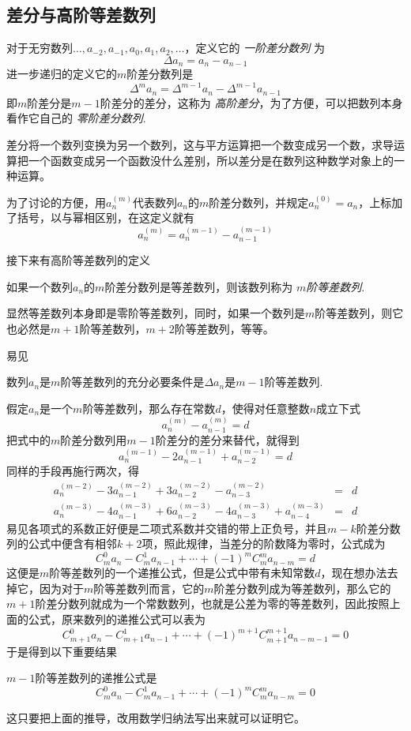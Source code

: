 \subsection{差分与高阶等差数列}
\label{sec:difference-and-high-level-common-difference-sequence}

\begin{definition}
  对于无穷数列$\ldots,a_{-2},a_{-1},a_0,a_1,a_2,\ldots$，定义它的 \emph{一阶差分数列} 为
  \[ \Delta a_n = a_n-a_{n-1} \]
  进一步递归的定义它的$m$阶差分数列是
  \[ \Delta^ma_n = \Delta^{m-1}a_n - \Delta^{m-1}a_{n-1} \]
  即$m$阶差分是$m-1$阶差分的差分，这称为 \emph{高阶差分}，为了方便，可以把数列本身看作它自己的 \emph{零阶差分数列}.
\end{definition}

差分将一个数列变换为另一个数列，这与平方运算把一个数变成另一个数，求导运算把一个函数变成另一个函数没什么差别，所以差分是在数列这种数学对象上的一种运算。

为了讨论的方便，用$a_n^{(m)}$代表数列$a_n$的$m$阶差分数列，并规定$a_n^{(0)}=a_n$，上标加了括号，以与幂相区别，在这定义就有
\[ a_n^{(m)} = a_n^{(m-1)} - a_{n-1}^{(m-1)} \]

接下来有高阶等差数列的定义
\begin{definition}
  如果一个数列$a_n$的$m$阶差分数列是等差数列，则该数列称为 \emph{$m$阶等差数列}.
\end{definition}

显然等差数列本身即是零阶等差数列，同时，如果一个数列是$m$阶等差数列，则它也必然是$m+1$阶等差数列，$m+2$阶等差数列，等等。

易见
\begin{theorem}
  数列$a_n$是$m$阶等差数列的充分必要条件是$\Delta a_n$是$m-1$阶等差数列.
\end{theorem}

假定$a_n$是一个$m$阶等差数列，那么存在常数$d$，使得对任意整数$n$成立下式
\[ a_n^{(m)} - a_{n-1}^{(m)} = d \]
把式中的$m$阶差分数列用$m-1$阶差分的差分来替代，就得到
\[ a_n^{(m-1)}-2a_{n-1}^{(m-1)}+a_{n-2}^{(m-1)} = d \]
同样的手段再施行两次，得
\begin{eqnarray*}
 a_n^{(m-2)}-3a_{n-1}^{(m-2)}+3a_{n-2}^{(m-2)}-a_{n-3}^{(m-2)} & = & d  \\
 a_n^{(m-3)}-4a_{n-1}^{(m-3)}+6a_{n-2}^{(m-3)}-4a_{n-3}^{(m-3)}+a_{n-4}^{(m-3)} & = & d 
\end{eqnarray*}
易见各项式的系数正好便是二项式系数并交错的带上正负号，并且$m-k$阶差分数列的公式中便含有相邻$k+2$项，照此规律，当差分的阶数降为零时，公式成为
\[ C_m^0a_n-C_m^1a_{n-1}+\cdots+(-1)^mC_m^ma_{n-m} = d \]
这便是$m$阶等差数列的一个递推公式，但是公式中带有未知常数$d$，现在想办法去掉它，因为对于$m$阶等差数列而言，它的$m$阶差分数列成为等差数列，那么它的$m+1$阶差分数列就成为一个常数数列，也就是公差为零的等差数列，因此按照上面的公式，原来数列的递推公式可以表为
\[ C_{m+1}^0a_n-C_{m+1}^1a_{n-1}+\cdots+(-1)^{m+1}C_{m+1}^{m+1}a_{n-m-1} = 0 \]
于是得到以下重要结果
\begin{theorem}
  $m-1$阶等差数列的递推公式是
\[ C_m^0a_n-C_m^1a_{n-1}+\cdots+(-1)^mC_m^ma_{n-m} = 0 \]
\end{theorem}
这只要把上面的推导，改用数学归纳法写出来就可以证明它。

